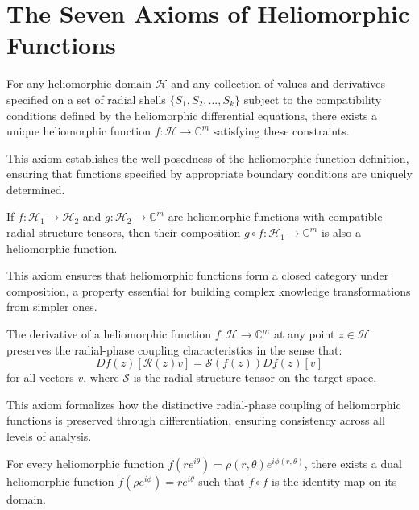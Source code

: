 \section{The Seven Axioms of Heliomorphic Functions}

\begin{axiom}
For any heliomorphic domain $\mathcal{H}$ and any collection of values and derivatives specified on a set of radial shells $\{S_1, S_2, \ldots, S_k\}$ subject to the compatibility conditions defined by the heliomorphic differential equations, there exists a unique heliomorphic function $f: \mathcal{H} \rightarrow \mathbb{C}^m$ satisfying these constraints.
\end{axiom}

This axiom establishes the well-posedness of the heliomorphic function definition, ensuring that functions specified by appropriate boundary conditions are uniquely determined.

\begin{axiom}
If $f: \mathcal{H}_1 \rightarrow \mathcal{H}_2$ and $g: \mathcal{H}_2 \rightarrow \mathbb{C}^m$ are heliomorphic functions with compatible radial structure tensors, then their composition $g \circ f: \mathcal{H}_1 \rightarrow \mathbb{C}^m$ is also a heliomorphic function.
\end{axiom}

This axiom ensures that heliomorphic functions form a closed category under composition, a property essential for building complex knowledge transformations from simpler ones.

\begin{axiom}
The derivative of a heliomorphic function $f: \mathcal{H} \rightarrow \mathbb{C}^m$ at any point $z \in \mathcal{H}$ preserves the radial-phase coupling characteristics in the sense that:
\begin{equation}
Df(z)[\mathcal{R}(z)v] = \mathcal{S}(f(z))Df(z)[v]
\end{equation}
for all vectors $v$, where $\mathcal{S}$ is the radial structure tensor on the target space.
\end{axiom}

This axiom formalizes how the distinctive radial-phase coupling of heliomorphic functions is preserved through differentiation, ensuring consistency across all levels of analysis.

\begin{axiom}
For every heliomorphic function $f(re^{i\theta}) = \rho(r,\theta)e^{i\phi(r,\theta)}$, there exists a dual heliomorphic function $\tilde{f}(\rho e^{i\phi}) = re^{i\theta}$ such that $\tilde{f} \circ f$ is the identity map on its domain.
\end{axiom}


